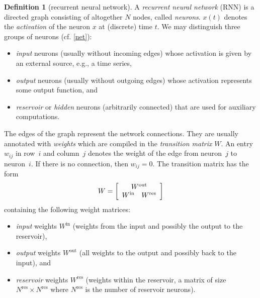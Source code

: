 \documentclass[twoside,11pt]{article}
\theoremstyle{definition}
\newtheorem{defn}{Definition}
\begin{document}
\begin{defn}[recurrent neural network]
A \emph{recurrent neural network} (RNN) is a directed graph consisting of
altogether $N$ nodes, called \emph{neurons}. $x(t)$ denotes the
\emph{activation} of the neuron $x$ at (discrete) time $t$. We may distinguish
three groups of neurons (cf. \cref{net}):
\begin{itemize}
  \item \emph{input} neurons (usually without incoming edges) whose activation
	is given by an external source, e.g., a time series,
  \item \emph{output} neurons (usually without outgoing edges) whose activation
	represents some output function, and
  \item \emph{reservoir} or \emph{hidden} neurons (arbitrarily connected) that
	are used for auxiliary computations.
\end{itemize}

The edges of the graph represent the network connections. They are usually
annotated with \emph{weights} which are compiled in the \emph{transition matrix}
$W$. An entry~$w_{ij}$ in row~$i$ and column~$j$ denotes the weight of the edge
from neuron~$j$ to neuron~$i$. If there is no connection, then
$w_{ij} = 0$. The transition matrix has the form
\begin{equation}\label{matrix}
  W = \left[ \begin{array}{cc}
  \multicolumn{2}{c}{W^\mathrm{out}}\\
  W^\mathrm{in} & W^\mathrm{res}
\end{array} \right]
\end{equation}
containing the following weight matrices:
\begin{itemize}
  \item \emph{input} weights $W^\mathrm{in}$ (weights from the input and
	possibly the output to the reservoir),
  \item \emph{output} weights $W^\mathrm{out}$ (all weights to the output and
	possibly back to the input), and
  \item \emph{reservoir} weights $W^\mathrm{res}$ (weights within the reservoir,
	a matrix of size $N^\mathrm{res} \times N^\mathrm{res}$ where
	$N^\mathrm{res}$ is the number of reservoir neurons).
\end{itemize}
\end{defn}
\end{document}
